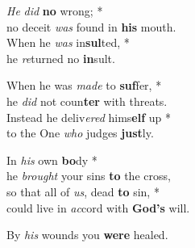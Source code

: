
\emph{He} \emph{did} \textbf{no} wrong; *\\
no deceit \emph{was} found in \textbf{his} mouth.\\
When he \emph{was} in\textbf{sul}ted, *\\
he \emph{re}turned no \textbf{in}sult.

When he was \emph{made} to \textbf{suf}fer, *\\
he \emph{did} not coun\textbf{ter} with threats.\\
Instead he deliv\emph{ered} hims\textbf{elf} up *\\
to the One \emph{who} judges \textbf{just}ly.

In \emph{his} own \textbf{bo}dy *\\
he \emph{brought} your sins \textbf{to} the cross,\\
so that all of \emph{us}, dead \textbf{to} sin, *\\
could live in \emph{ac}cord with \textbf{God's} will.

By \emph{his} wounds you \textbf{were} healed.